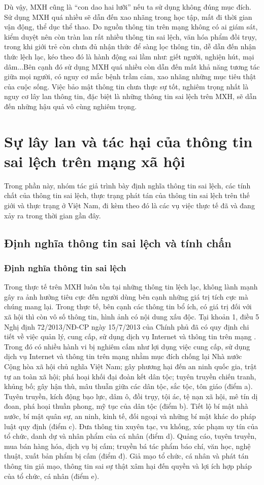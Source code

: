 		Dù vậy, MXH cũng là “con dao hai lưỡi” nếu ta sử dụng không đúng mục đích. Sử dụng MXH quá nhiều sẽ dẫn đến xao nhãng trong học tập, mất đi thời gian vận động, thể dục thể thao. Do nguồn thông tin trên mạng không có ai giám sát, kiểm duyệt nên còn tràn lan rất nhiều thông tin sai lệch, văn hóa phẩm đồi trụy, trong khi giới trẻ còn chưa đủ nhận thức để sàng lọc thông tin, dễ dẫn đến nhận thức lệch lạc, kéo theo đó là hành động sai lầm như: giết người, nghiện hút, mại dâm...Bên cạnh đó sử dụng MXH quá nhiều còn dẫn đến mất khả năng tương tác giữa mọi người, có nguy cơ mắc bệnh trầm cảm, xao nhãng những mục tiêu thật của cuộc sống. Việc bảo mật thông tin chưa thực sự tốt, nghiêm trọng nhất là nguy cơ lây lan thông tin, đặc biệt là những thông tin sai lệch trên MXH, sẽ dẫn đến những hậu quả vô cùng nghiêm trọng.
		
\section{Sự lây lan và tác hại của thông tin sai lệch trên mạng xã hội}
Trong phần này, nhóm tác giả trình bày định nghĩa thông tin sai lệch, các tính chất của thông tin sai lệch, thực trạng phát tán của thông tin sai lệch trên thế giới và thực trạng ở Việt Nam, đi kèm theo đó là các vụ việc thực tế đã và đang xảy ra trong thời gian gần đây.
	\subsection{Định nghĩa thông tin sai lệch và tính chấn}
		\subsubsection{Định nghĩa thông tin sai lệch}
		Trong thực tế trên MXH luôn tồn tại những thông tin lệch lạc, không lành mạnh gây ra ảnh hưởng tiêu cực đến người dùng bên cạnh những giá trị tích cực mà chúng mang lại. Trong thực tế, bên cạnh các thông tin bổ ích, có giá trị đối với xã hội thì còn vô số thông tin, hình ảnh có nội dung xấu độc. Tại khoản 1, điều 5 Nghị định 72/2013/NĐ-CP ngày 15/7/2013 của Chính phủ đã có quy định chi tiết về việc quản lý, cung cấp, sử dụng dịch vụ Internet và thông tin trên mạng \cite{quidinh}. Trong đó có nhiều hành vi bị nghiêm cấm như lợi dụng việc cung cấp, sử dụng dịch vụ Internet và thông tin trên mạng nhằm mục đích chống lại Nhà nước Cộng hòa xã hội chủ nghĩa Việt Nam; gây phương hại đến an ninh quốc gia, trật tự an toàn xã hội; phá hoại khối đại đoàn kết dân tộc; tuyên truyền chiến tranh, khủng bố; gây hận thù, mâu thuẫn giữa các dân tộc, sắc tộc, tôn giáo (điểm a). Tuyên truyền, kích động bạo lực, dâm ô, đồi trụy, tội ác, tệ nạn xã hội, mê tín dị đoan, phá hoại thuần phong, mỹ tục của dân tộc (điểm b). Tiết lộ bí mật nhà nước, bí mật quân sự, an ninh, kinh tế, đối ngoại và những bí mật khác do pháp luật quy định (điểm c). Đưa thông tin xuyên tạc, vu khống, xúc phạm uy tín của tổ chức, danh dự và nhân phẩm của cá nhân (điểm d). Quảng cáo, tuyên truyền, mua bán hàng hóa, dịch vụ bị cấm; truyền bá tác phẩm báo chí, văn học, nghệ thuật, xuất bản phẩm bị cấm (điểm đ). Giả mạo tổ chức, cá nhân và phát tán thông tin giả mạo, thông tin sai sự thật xâm hại đến quyền và lợi ích hợp pháp của tổ chức, cá nhân (điểm e).

